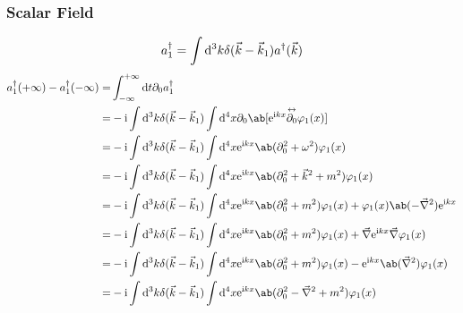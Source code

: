 \documentclass{article}
\newcommand{\rme}{\mathrm{e}}
\newcommand{\rmi}{\mathrm{i}}
\newcommand{\veck}{\vec{k}}
\begin{document}
\subsubsection{Scalar Field}

\[ a^{\dagger}_1 = \int \odif[order=3]{k} \delta(\veck - \veck_1) a^{\dagger}(\veck) \]
\begin{align*}
    a^{\dagger}_1(+ \infty) - a^{\dagger}_1(- \infty) = & \int_{- \infty}^{+ \infty} \odif{t} \partial_0 a_1^{\dagger}                                                                                                                               \\
    =                                                   & - \rmi \int \odif[order=3]{k} \delta(\veck - \veck_1) \int \odif[order=4]{x} \partial_0 \ab[\rme^{\rmi k x} \overset{\leftrightarrow}{\partial_0} \varphi_1(x)]                            \\
    =                                                   & - \rmi \int \odif[order=3]{k} \delta(\veck - \veck_1) \int \odif[order=4]{x} \rme^{\rmi k x} \ab(\partial_0^2 + \omega^2) \varphi_1(x)                                                     \\
    =                                                   & - \rmi \int \odif[order=3]{k} \delta(\veck - \veck_1) \int \odif[order=4]{x} \rme^{\rmi k x} \ab(\partial_0^2 + \veck^2 + m^2) \varphi_1(x)                                                \\
    =                                                   & - \rmi \int \odif[order=3]{k} \delta(\veck - \veck_1) \int \odif[order=4]{x} \rme^{\rmi k x} \ab(\partial_0^2 + m^2) \varphi_1(x) + \varphi_1(x) \ab(- \vec{\nabla}^2) \rme^{\rmi k x}     \\
    =                                                   & - \rmi \int \odif[order=3]{k} \delta(\veck - \veck_1) \int \odif[order=4]{x} \rme^{\rmi k x} \ab(\partial_0^2 + m^2) \varphi_1(x) + \vec{\nabla} \rme^{\rmi k x} \vec{\nabla} \varphi_1(x) \\
    =                                                   & - \rmi \int \odif[order=3]{k} \delta(\veck - \veck_1) \int \odif[order=4]{x} \rme^{\rmi k x} \ab(\partial_0^2 + m^2) \varphi_1(x) - \rme^{\rmi k x} \ab(\vec{\nabla}^2) \varphi_1(x)       \\
    =                                                   & - \rmi \int \odif[order=3]{k} \delta(\veck - \veck_1) \int \odif[order=4]{x} \rme^{\rmi k x} \ab(\partial_0^2 - \vec{\nabla}^2 + m^2) \varphi_1(x)                                         \\

\end{align*}
\end{document}
